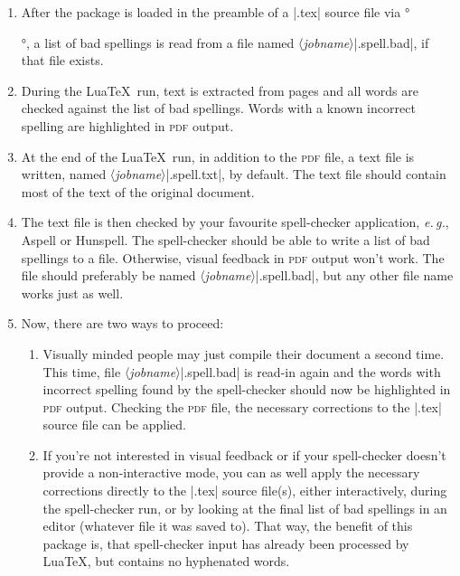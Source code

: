 \documentclass[11pt]{article}
\newcommand*{\acr}[1]{\mbox{\scshape#1}}
\newcommand*{\descr}[1]{〈\emph{#1}〉}
\newcommand*{\latinphrase}[1]{\foreignlanguage{latin}{\emph{#1}}}
\newcommand*{\lpeg}{\latinphrase{e.\,g.}\xspace}
\begin{document}
\begin{enumerate}

\item After the package is loaded in the preamble of a |.tex| source
  file via °\usepackage{spelling}°, a list of bad spellings is read from
  a file named \descr{jobname}|.spell.bad|, if that file exists.

\item During the Lua\TeX\ run, text is extracted from pages and all
  words are checked against the list of bad spellings.  Words with a
  known incorrect spelling are highlighted in \acr{pdf} output.

\item At the end of the Lua\TeX\ run, in addition to the \acr{pdf} file,
  a text file is written, named \descr{jobname}|.spell.txt|, by default.
  The text file should contain most of the text of the original
  document.

\item The text file is then checked by your favourite spell-checker
  application, \lpeg, Aspell or Hunspell.  The spell-checker should be
  able to write a list of bad spellings to a file.  Otherwise, visual
  feedback in \acr{pdf} output won't work.  The file should preferably
  be named \descr{jobname}|.spell.bad|, but any other file name works
  just as well.

\item Now, there are two ways to proceed:

  \begin{enumerate}

  \item Visually minded people may just compile their document a second
    time.  This time, file \descr{jobname}|.spell.bad| is read-in again
    and the words with incorrect spelling found by the spell-checker
    should now be highlighted in \acr{pdf} output.  Checking the
    \acr{pdf} file, the necessary corrections to the |.tex| source file
    can be applied.

  \item If you're not interested in visual feedback or if your
    spell-checker doesn't provide a non-interactive mode, you can as
    well apply the necessary corrections directly to the |.tex| source
    file(s), either interactively, during the spell-checker run, or by
    looking at the final list of bad spellings in an editor (whatever
    file it was saved to).  That way, the benefit of this package is,
    that spell-checker input has already been processed by Lua\TeX, but
    contains no hyphenated words.

  \end{enumerate}

\end{enumerate}
\end{document}
